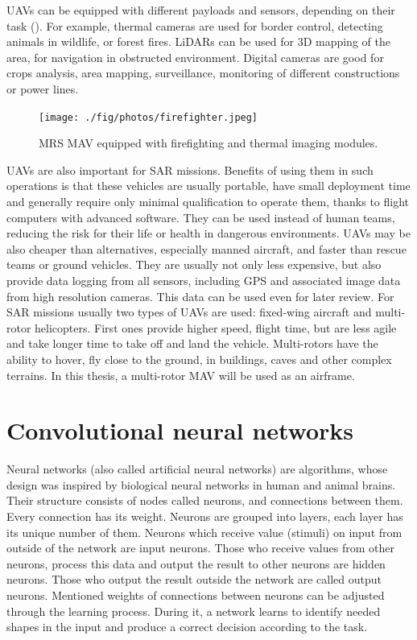 \acs{UAV}s can be equipped with different payloads and sensors, depending on their task (). For example, thermal cameras are used for border control, detecting animals in wildlife, or forest fires. \acs{LiDAR}s can be used for 3D mapping of the area, for navigation in obstructed environment. Digital cameras are good for crops analysis, area mapping, surveillance, monitoring of different constructions or power lines. 


\begin{figure}[!h]
  \centering
  \texttt{[image: ./fig/photos/firefighter.jpeg]}

  \caption{\acs{MRS} \acs{MAV} equipped with firefighting and thermal imaging modules.}
  \label{fig:firefighter}
\end{figure}


\acs{UAV}s are also important for \ac{SAR} missions. Benefits of using them in such operations is that these vehicles are usually portable, have small deployment time and generally require only minimal qualification to operate them, thanks to flight computers with advanced software. They can be used instead of human teams, reducing the risk for their life or health in dangerous environments. \acs{UAV}s may be also cheaper than alternatives, especially manned aircraft, and faster than rescue teams or ground vehicles. They are usually not only less expensive, but also provide data logging from all sensors, including \acs{GPS} and associated image data from high resolution cameras. This data can be used even for later review. For \acs{SAR} missions usually two types of \acs{UAV}s are used: fixed-wing aircraft and multi-rotor helicopters. First ones provide higher speed, flight time, but are less agile and take longer time to take off and land the vehicle. Multi-rotors have the ability to hover, fly close to the ground, in buildings, caves and other complex terrains. In this thesis, a multi-rotor \acs{MAV} will be used as an airframe. 


\section{Convolutional neural networks}

Neural networks (also called artificial neural networks) are algorithms, whose design was inspired by biological neural networks in human and animal brains. Their structure consists of nodes called neurons, and connections between them. Every connection has its weight. Neurons are grouped into layers, each layer has its unique number of them. Neurons which receive value (stimuli) on input from outside of the network are input neurons. Those who receive values from other neurons, process this data and output the result to other neurons are hidden neurons. Those who output the result outside the network are called output neurons. Mentioned weights of connections between neurons can be adjusted through the learning process. During it, a network learns to identify needed shapes in the input and produce a correct decision according to the task. 

